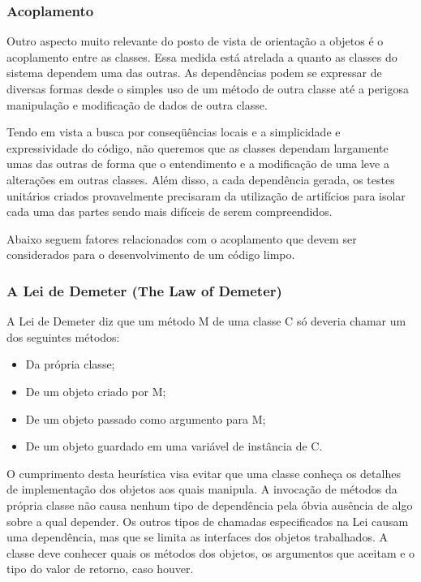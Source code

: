 \subsubsection{Acoplamento}
	Outro aspecto muito relevante do posto de vista de orientação a objetos é o acoplamento entre as classes. Essa medida está atrelada a quanto as classes do sistema dependem uma das outras. As  dependências podem se expressar de diversas formas desde o simples uso de um método de outra classe até a perigosa manipulação e modificação de dados de outra classe.
	
	Tendo em vista a busca por conseqüências locais e a simplicidade e expressividade do código, não queremos que as classes dependam largamente umas das outras de forma que o entendimento e a modificação de uma leve a alterações em outras classes. Além disso, a cada dependência gerada, os testes unitários criados provavelmente precisaram da utilização de artifícios para isolar cada uma das partes sendo mais difíceis de serem compreendidos.
	
	Abaixo seguem fatores relacionados com o acoplamento que devem ser considerados para o desenvolvimento de um código limpo.

\subsubsection{A Lei de Demeter (The Law of Demeter)}
	A Lei de Demeter diz que um método M de uma classe C só deveria chamar um dos seguintes métodos:

\begin{itemize}
	\item Da própria classe;
	\item De um objeto criado por M;
	\item De um objeto passado como argumento para M;
	\item De um objeto guardado em uma variável de instância de C.
\end{itemize}

	O cumprimento desta heurística visa evitar que uma classe conheça os detalhes de implementação dos objetos aos quais manipula. A invocação de métodos da própria classe não causa nenhum tipo de dependência pela óbvia ausência de algo sobre a qual depender. Os outros tipos de chamadas especificados na Lei causam uma dependência, mas que se limita as interfaces dos objetos trabalhados. A classe deve conhecer quais os métodos dos objetos, os argumentos que aceitam e o tipo do valor de retorno, caso houver.
	

